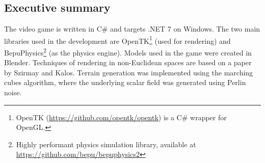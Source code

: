 \subsection{Executive summary}

The video game is written in C\# and targets .NET 7 on Windows.
The two main libraries used in the development are OpenTK\footnote{OpenTK (\url{https://github.com/opentk/opentk}) is a C\# wrapper for OpenGL.} (used for rendering)
and BepuPhysics\footnote{Highly performant\cite{BepuPhysics} physics simulation library, available at \url{https://github.com/bepu/bepuphysics2}} (as the physics engine).
Models used in the game were created in Blender.
Techniques of rendering in non-Euclidean spaces are based on a paper by Szirmay and Kalos.
Terrain generation was implemented using the marching cubes algorithm,
where the underlying scalar field was generated using Perlin noise.